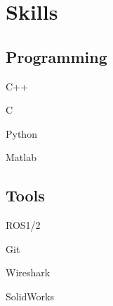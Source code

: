 \documentclass[letterpaper]{deedy-resume} %
\begin{document}
\begin{minipage}[t]{0.28\textwidth} %









\section{Skills}

\subsection{Programming}


\vspace{\topsep} %
\begin{tightitemize}
\item C++
\item C
\item Python
\item Matlab
\end{tightitemize}

\sectionspace

\subsection{Tools}

\vspace{\topsep} %
\begin{tightitemize}
\item ROS1/2
\item Git
\item Wireshark
\item SolidWorks
\end{tightitemize}


\end{minipage}
\end{document}
